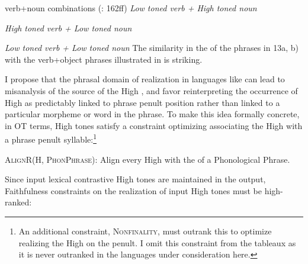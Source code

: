 \documentclass[output=paper
,newtxmath
,modfonts
,nonflat]{../langsci/langscibook}
\begin{document}
\ea\label{ex:downing:13}  verb+noun combinations (\citealt{Kisseberth1984}: 162ff)
\ea\label{ex:downing:13a} \textit{Low toned verb + High toned noun}
\sn
{}
\sn
{}
\sn
{}

\ex\label{ex:downing:13b}  \textit{High toned verb + Low toned noun}
\sn
{}
\sn
{}
\sn
{}
\sn
{}

\ex\label{ex:downing:13c}\textit{Low toned verb + Low toned noun}
\sn
{}
\sn
{}
\z
\z
The similarity in the  of the  phrases in 13a, b) with the  verb+object phrases illustrated in  is striking.

I propose that the phrasal domain of  realization in languages like  can lead to misanalysis of the source of the High , and favor reinterpreting the occurrence of High  as predictably linked to phrase penult position rather than linked to a particular morpheme or word in the phrase. To make this idea formally concrete, in OT terms,  High tones satisfy a constraint optimizing associating the High  with a phrase penult syllable:\footnote{An additional constraint, \textsc{Nonfinality,} must outrank this  to optimize realizing the High  on the penult. I omit this constraint from the tableaux as it is never outranked in the languages under consideration here.}


\ea\label{ex:downing:14}\textsc{AlignR(H, PhonPhrase}):
\sn
Align every High  with the  of a Phonological Phrase.
\z 

Since input lexical contrastive High tones are maintained in the output, Faithfulness constraints on the realization of input High tones must be high-ranked:
\end{document}
